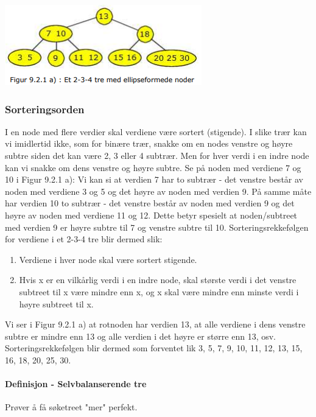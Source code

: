 \documentclass[11pt]{article}
\begin{document}
        \includegraphics[center]{f-9.2.1a.png}

        \subsubsection{Sorteringsorden}
            I en node med flere verdier skal verdiene være sortert (stigende). I slike
            trær kan vi imidlertid ikke, som for binære trær, snakke om en nodes venstre og høyre subtre
            siden det kan være 2, 3 eller 4 subtrær. Men for hver verdi i en indre node kan vi snakke om
            dens venstre og høyre subtre. Se på noden med verdiene 7 og 10 i Figur 9.2.1 a): Vi kan si
            at verdien 7 har to subtrær - det venstre består av noden med verdiene 3 og 5 og det høyre
            av noden med verdien 9. På samme måte har verdien 10 to subtrær - det venstre består av
            noden med verdien 9 og det høyre av noden med verdiene 11 og 12. Dette betyr spesielt at
            noden/subtreet med verdien 9 er høyre subtre til 7 og venstre subtre til 10.
            Sorteringsrekkefølgen for verdiene i et 2-3-4 tre blir dermed slik:
                \begin{enumerate}
                    \item Verdiene i hver node skal være sortert stigende.
                    \item Hvis x er en vilkårlig verdi i en indre node, skal største verdi i det venstre subtreet til x
                    være mindre enn x, og x skal være mindre enn minste verdi i høyre subtreet til x.
                \end{enumerate}


            Vi ser i Figur 9.2.1 a) at rotnoden har verdien 13, at alle verdiene i dens venstre subtre er
            mindre enn 13 og alle verdien i det høyre er større enn 13, osv. Sorteringsrekkefølgen blir
            dermed som forventet lik 3, 5, 7, 9, 10, 11, 12, 13, 15, 16, 18, 20, 25, 30. 

        \paragraph{Definisjon - Selvbalanserende tre}
        Prøver å få søketreet "mer" perfekt.
\end{document}
